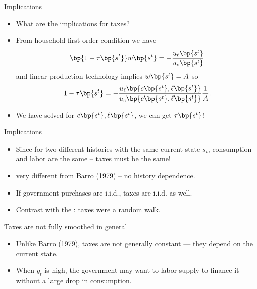 \documentclass[11pt,xcolor={dvipsnames},aspectratio=159,hyperref={pdftex,pdfpagemode=UseNone,hidelinks,pdfdisplaydoctitle=true},usepdftitle=false]{beamer}
\begin{document}
            \begin{frame}{Implications}
                \begin{itemize}
                \item What are the implications for taxes?
                \item From household first order condition we have 
                \begin{align*}
                    \bp{1-\tau\bp{s^t}} w\bp{s^t} = - \frac{u_\ell\bp{s^t}}{u_c\bp{s^t}}
                \end{align*}
                and linear production technology implies $w\bp{s^t} = A$ so
                \begin{align*}
                    1-\tau\bp{s^t}  = - \frac{u_\ell\bp{c \bp{s^t},\ell\bp{s^t}}}{u_c\bp{c \bp{s^t},\ell\bp{s^t}}} \frac{1}{A}.
                \end{align*}
                \item We have solved for $c \bp{s^t},\ell\bp{s^t}$, we can get $\tau\bp{s^t}$!
                \end{itemize}
            \end{frame}
                    
            \begin{frame}{Implications}
                \begin{itemize}
                \item Since for two different histories with the same current state $s_t$, consumption and labor are the same -- taxes must be the same!
                \item {} very different from Barro (1979) -- no history dependence.
                \item If government purchases are i.i.d., taxes are i.i.d. as well.
                \item Contrast with the : taxes were a random walk.
                \end{itemize}
            \end{frame}
        
            \begin{frame}{Taxes are not fully smoothed in general}
                \begin{itemize}
                \item Unlike Barro (1979), taxes are not generally constant --- they depend on the current state.
                \item When $g_t$ is high, the government may want to  labor supply to finance it without a large drop in consumption.
                \end{itemize}
            \end{frame}
        
\end{document}
